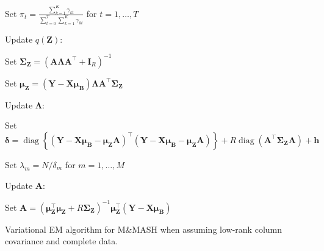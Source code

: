 \documentclass[11pt,authoryear]{article}
\DeclareMathOperator*{\diag}{diag}
\newcommand{\bs}[1]{\boldsymbol{#1}}
\begin{document}
\begin{algorithm}
\begin{algorithmic}
\begin{description}
  \item Set $\pi_t = \frac{\sum_{k = 1}^K\gamma_{kt}}{\sum_{t = 0}^T\sum_{k = 1}^K\gamma_{kt}}$ for $t = 1,\ldots, T$
  \end{description}
  \STATE Update $q(\bs{Z})$:
  \begin{description}
  \item Set $\bs{\Sigma}_{\bs{Z}} = \left(\bs{A}\bs{\Lambda}\bs{A}^{\intercal} + \bs{I}_R\right)^{-1}$
  \item Set $\bs{\mu}_{\bs{Z}} = (\bs{Y}-\bs{X}\bs{\mu}_{\bs{B}})\bs{\Lambda} \bs{A}^{\intercal}\bs{\Sigma}_{\bs{Z}}$
  \end{description}
  \STATE Update $\bs{\Lambda}$:
  \begin{description}
  \item Set $\bs{\delta} = \diag\left\{(\bs{Y}-\bs{X}\bs{\mu}_{\bs{B}} - \bs{\mu}_{\bs{Z}}\bs{A})^{\intercal}(\bs{Y}-\bs{X}\bs{\mu}_{\bs{B}} - \bs{\mu}_{\bs{Z}}\bs{A})\right\} + R\diag(\bs{A}^{\intercal}\bs{\Sigma}_{\bs{Z}}\bs{A}) + \bs{h}$
  \item Set $\lambda_m = N / \delta_m$ for $m = 1,\ldots,M$
  \end{description}
  \STATE Update $\bs{A}$:
  \begin{description}
  \item Set $\bs{A} = \left(\bs{\mu}_{\bs{Z}}^{\intercal}\bs{\mu}_{\bs{Z}} + R\bs{\Sigma}_{\bs{Z}}\right)^{-1} \bs{\mu}_{\bs{Z}}^{\intercal}(\bs{Y} - \bs{X}\bs{\mu}_{\bs{B}})$
  \end{description}
\end{algorithmic}
\caption{Variational EM algorithm for M\&MASH when assuming low-rank column covariance and complete data.}
\label{algorithm:vem}
\end{algorithm}
\end{document}
